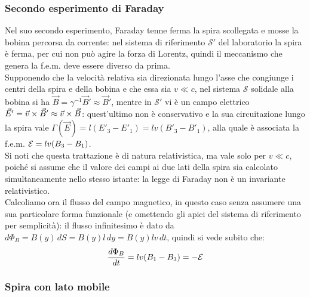 \subsubsection{Secondo esperimento di Faraday}

Nel suo secondo esperimento, Faraday tenne ferma la spira scollegata e mosse la bobina percorsa da corrente: nel sistema di riferimento $ \mathcal{S}' $ del laboratorio la spira è ferma, per cui non può agire la forza di Lorentz, quindi il meccanismo che genera la f.e.m. deve essere diverso da prima. \\ 
%
Supponendo che la velocità relativa sia direzionata lungo l'asse che congiunge i centri della spira e della bobina e che essa sia $ v \ll c $, nel sistema $ \mathcal{S} $ solidale alla bobina si ha $ \vec{B} = \gamma^{-1} \vec{B}' \approx \vec{B}' $, mentre in $ \mathcal{S}' $ vi è un campo elettrico $ \vec{E}' = \vec{v}\times\vec{B}' \approx \vec{v}\times\vec{B} $: quest'ultimo non è conservativo e la sua circuitazione lungo la spira vale $ \Gamma(\vec{E}) = l (E'_3 - E'_1) = lv (B'_3 - B'_1) $, alla quale è associata la f.e.m. $ \mathcal{E} = lv (B_3 - B_1) $. \\ 
%
Si noti che questa trattazione è di natura relativistica, ma vale solo per $ v \ll c $, poiché si assume che il valore dei campi ai due lati della spira sia calcolato simultaneamente nello stesso istante: la legge di Faraday non è un invariante relativistico. \\ 
%
Calcoliamo ora il flusso del campo magnetico, in questo caso senza assumere una sua particolare forma funzionale (e omettendo gli apici del sistema di riferimento per semplicità): il flusso infinitesimo è dato da $ d\Phi_B = B(y) \,dS = B(y) l \,dy = B(y) lv \,dt $, quindi si vede subito che:
\begin{equation}
	\frac{d\Phi_B}{dt} = lv (B_1 - B_3) = -\mathcal{E}
	\label{eq:4}
\end{equation}

\subsubsection{Spira con lato mobile}

